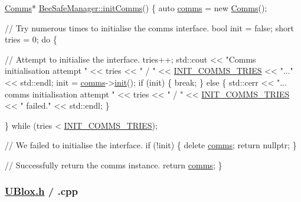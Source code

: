 \begin{DoxyCode}
\hyperlink{class_comms}{Comms}* \hyperlink{class_bee_safe_manager_a28306d7ccf7136a6086d666f4ebb6566}{BeeSafeManager::initComms}()
\{
    \textcolor{keyword}{auto} \hyperlink{class_bee_safe_manager_a80b19afbb679d08be14d67a45447f9e1}{comms} = \textcolor{keyword}{new} \hyperlink{class_comms}{Comms}();

    \textcolor{comment}{// Try numerous times to initialise the comms interface.}
    \textcolor{keywordtype}{bool} init = \textcolor{keyword}{false};
    \textcolor{keywordtype}{short} tries = 0;
    \textcolor{keywordflow}{do} \{

        \textcolor{comment}{// Attempt to initialise the interface.}
        tries++;
        std::cout << \textcolor{stringliteral}{"Comms initialisation attempt "} << tries << \textcolor{stringliteral}{" / "} << 
      \hyperlink{_bee_safe_8cpp_aa5860d80bbb4527d5d2275aacfce65f7}{INIT\_COMMS\_TRIES} << \textcolor{stringliteral}{"..."} <<  std::endl;
        init = \hyperlink{class_bee_safe_manager_a80b19afbb679d08be14d67a45447f9e1}{comms}->\hyperlink{class_comms_aa0519d3ed2d5bd6aad60101080ac2de7}{init}();
        \textcolor{keywordflow}{if} (init) \{
            \textcolor{keywordflow}{break};
        \} \textcolor{keywordflow}{else} \{
            std::cerr << \textcolor{stringliteral}{"... comms initialisation attempt "} << tries << \textcolor{stringliteral}{" / "} << 
      \hyperlink{_bee_safe_8cpp_aa5860d80bbb4527d5d2275aacfce65f7}{INIT\_COMMS\_TRIES} << \textcolor{stringliteral}{" failed."} << std::endl;
        \}

    \} \textcolor{keywordflow}{while} (tries < \hyperlink{_bee_safe_8cpp_aa5860d80bbb4527d5d2275aacfce65f7}{INIT\_COMMS\_TRIES});

    \textcolor{comment}{// We failed to initialise the interface.}
    \textcolor{keywordflow}{if} (!init) \{
        \textcolor{keyword}{delete} \hyperlink{class_bee_safe_manager_a80b19afbb679d08be14d67a45447f9e1}{comms};
        \textcolor{keywordflow}{return} \textcolor{keyword}{nullptr};
    \}

    \textcolor{comment}{// Successfully return the comms instance.}
    \textcolor{keywordflow}{return} \hyperlink{class_bee_safe_manager_a80b19afbb679d08be14d67a45447f9e1}{comms};
\}
\end{DoxyCode}


\subsubsection*{\hyperlink{_u_blox_8h}{U\+Blox.\+h} / .cpp}

